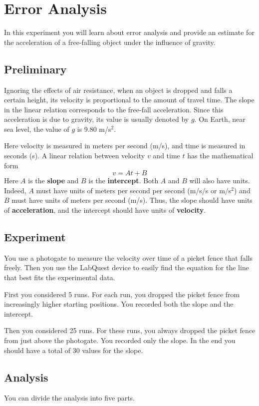 \chapter{Error Analysis}
%
In this experiment you will learn about error analysis and provide an estimate for the acceleration of a free-falling object under the influence of gravity.
%
\section{Preliminary}
%
Ignoring the effects of air resistance, when an object is dropped and falls a certain height, its velocity is proportional to the amount of travel time. The slope in the linear relation corresponds to the free-fall acceleration. Since this acceleration is due to gravity, its value is usually denoted by $g$. On Earth, near sea level, the value of $g$ is 9.80 m/s$^{2}$.

Here velocity is measured in meters per second (m/s), and time is measured in seconds (s). A linear relation between velocity $v$ and time $t$ has the mathematical form
\begin{equation}
    v = A t + B
\end{equation}
Here $A$ is the \textbf{slope} and $B$ is the \textbf{intercept}. Both $A$ and $B$ will also have units. Indeed, $A$ must have units of meters per second per second (m/s/s or m/s$^{2}$) and $B$ must have units of meters per second (m/s). Thus, the slope should have units of \textbf{acceleration}, and the intercept should have units of \textbf{velocity}.
%
\section{Experiment}
%
You use a photogate to measure the velocity over time of a picket fence that falls freely. Then you use the LabQuest device to easily find the equation for the line that best fits the experimental data.

First you considered 5 runs. For each run, you dropped the picket fence from increasingly higher starting positions. You recorded both the slope and the intercept.

Then you considered 25 runs. For these runs, you always dropped the picket fence from just above the photogate. You recorded only the slope. In the end you should have a total of 30 values for the slope.
%
\section{Analysis}
%
You can divide the analysis into five parts.
%

